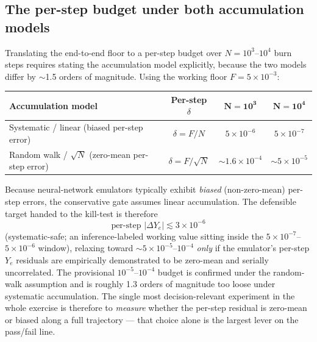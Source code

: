 \documentclass[11pt]{article}
\begin{document}
\subsection{The per-step budget under both accumulation models}

Translating the end-to-end floor to a per-step budget over $N = 10^3$--$10^4$ burn steps requires stating the accumulation model explicitly, because the two models differ by $\sim$1.5 orders of magnitude. Using the working floor $F = 5\times10^{-3}$:

\begin{center}
\small
\setlength{\tabcolsep}{10pt}
\renewcommand{\arraystretch}{1.35}
\begin{tabular}{@{}lccc@{}}
\toprule
\textbf{Accumulation model} & \textbf{Per-step $\delta$} & $\boldsymbol{N=10^3}$ & $\boldsymbol{N=10^4}$ \\
\midrule
Systematic / linear (biased per-step error) & $\delta = F/N$ & $5\times10^{-6}$ & $5\times10^{-7}$ \\
Random walk / $\sqrt{N}$ (zero-mean per-step error) & $\delta = F/\sqrt{N}$ & $\sim 1.6\times10^{-4}$ & $\sim 5\times10^{-5}$ \\
\bottomrule
\end{tabular}
\end{center}

\noindent Because neural-network emulators typically exhibit \emph{biased} (non-zero-mean) per-step errors, the conservative gate assumes linear accumulation. The defensible target handed to the kill-test is therefore
\begin{equation*}
\boxed{\;\text{per-step } |\Delta Y_e| \lesssim 3\times10^{-6}\;}
\end{equation*}
(systematic-safe; an inference-labeled working value sitting inside the $5\times10^{-7}$--$5\times10^{-6}$ window), relaxing toward $\sim 5\times10^{-5}$--$10^{-4}$ \emph{only} if the emulator's per-step $Y_e$ residuals are empirically demonstrated to be zero-mean and serially uncorrelated. The provisional $10^{-5}$--$10^{-4}$ budget is confirmed under the random-walk assumption and is roughly 1.3 orders of magnitude too loose under systematic accumulation. The single most decision-relevant experiment in the whole exercise is therefore to \emph{measure} whether the per-step residual is zero-mean or biased along a full trajectory --- that choice alone is the largest lever on the pass/fail line.
\end{document}
